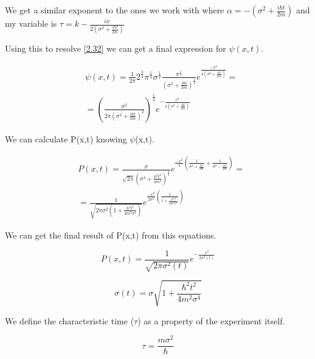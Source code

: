 We get a similar exponent to the ones we work with where $\alpha = - (\sigma^2 + \frac{i\hbar t}{2m})$ and my variable is $\tau = k - \frac{ix}{2(\sigma^2+\frac{i\hbar t}{2m})}$

Using this to resolve \ref{2.32} we can get a final expression for $\psi(x,t)$.

\begin{equation}
    \label{2.34}
    \begin{split}
        &\psi(x,t) = \frac{1}{2\pi} 2^\frac{3}{4} \pi^\frac{1}{4} \sigma^\frac{1}{2} \frac{\pi^\frac{1}{2}}{(\sigma^2 + \frac{i\hbar t}{2m})^\frac{1}{2}} e^{\frac{-x^2}{4(\sigma^2 + \frac{i\hbar t}{2m})}} = \\
        & = \left( \frac{\sigma^2}{2\pi(\sigma^2 + \frac{i\hbar t}{2m})^2}\right)^{\frac{1}{4}}e^{-\frac{x^2}{4(\sigma^2 + \frac{i\hbar t}{2m})}}
    \end{split}
\end{equation} 

We can calculate P(x,t) knowing $\psi$(x,t).

\begin{equation}
    \label{2.35}
    \begin{split}
        & P(x,t) = \frac{\sigma}{\sqrt{2\pi}(\sigma^4 + \frac{\hbar^2t^2}{4m^2})^\frac{1}{2}}e^{\frac{-x^2}{4}\left(  \frac{1}{\sigma^2 + \frac{ikt}{2m}} + \frac{1}{\sigma^2 - \frac{ikt}{2m}}   \right)} = \\
        & = \frac{1}{\sqrt{2\pi\sigma^2(1+\frac{\hbar^2t^2}{4m^2\sigma^4})}} e^{\frac{-x^2}{2\sigma^2}\left( 
     \frac{1}{1+\frac{k^2t^2}{4m^2\sigma^4}}\right)}
    \end{split}
\end{equation} 


We can get the final result of P(x,t) from this equations.

\begin{equation}
    \label{2.36}
    P(x,t) = \frac{1}{\sqrt{2\pi \sigma^2(t)}} e^{-\frac{x^2}{2\sigma^2(t)}} 
\end{equation} 

\begin{equation}
    \label{2.37}
    \sigma(t) = \sigma\sqrt{1+\frac{\hbar^2t^2}{4m^2\sigma^4}} 
\end{equation} 

We define the characteristic time ($\tau$) as a property of the experiment itself.

\begin{equation}
    \label{2.38}
    \tau = \frac{m\sigma^2}{\hbar} 
\end{equation} 

